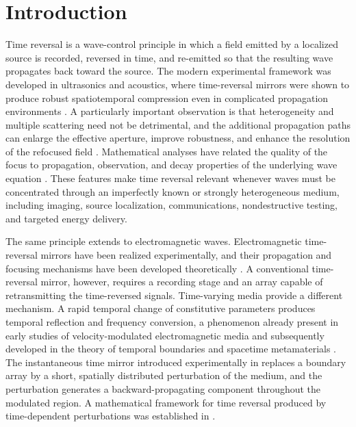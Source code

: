 \documentclass[11pt,reqno]{amsart}
\numberwithin{equation}{section}
\begin{document}

\maketitle

\section{Introduction}

Time reversal is a wave-control principle in which a field emitted by a localized source is recorded, reversed in time, and re-emitted so that the resulting wave propagates back toward the source. The modern experimental framework was developed in ultrasonics and acoustics, where time-reversal mirrors were shown to produce robust spatiotemporal compression even in complicated propagation environments \cite{Fink1992,Fink1997,FinkEtAl2000,FinkPrada2001}. A particularly important observation is that heterogeneity and multiple scattering need not be detrimental, and the additional propagation paths can enlarge the effective aperture, improve robustness, and enhance the resolution of the refocused field \cite{DerodeRouxFink1995,BlomgrenPapanicolaouZhao2002,BalRyzhik2003}. Mathematical analyses have related the quality of the focus to propagation, observation, and decay properties of the underlying wave equation \cite{BardosFink2002}. These features make time reversal relevant whenever waves must be concentrated through an imperfectly known or strongly heterogeneous medium, including imaging, source localization, communications, nondestructive testing, and targeted energy delivery.

The same principle extends to electromagnetic waves. Electromagnetic time-reversal mirrors have been realized experimentally, and their propagation and focusing mechanisms have been developed theoretically \cite{LeroseyEtAl2004,deRosnyLeroseyFink2010}. A conventional time-reversal mirror, however, requires a recording stage and an array capable of retransmitting the time-reversed signals. Time-varying media provide a different mechanism. A rapid temporal change of constitutive parameters produces temporal reflection and frequency conversion, a phenomenon already present in early studies of velocity-modulated electromagnetic media and subsequently developed in the theory of temporal boundaries and spacetime metamaterials \cite{Morgenthaler1958,XiaoMaywarAgrawal2014, PlansinisDonaldsonAgrawal2015,CalozDeckLeger2020,GaliffiEtAl2022}. The instantaneous time mirror introduced experimentally in \cite{BacotLabousseEddiFinkFort2016} replaces a boundary array by a short, spatially distributed perturbation of the medium, and the perturbation generates a backward-propagating component throughout the modulated region. A mathematical framework for time reversal produced by time-dependent perturbations was established in \cite{BalFinkPinaud2019}.
\end{document}
